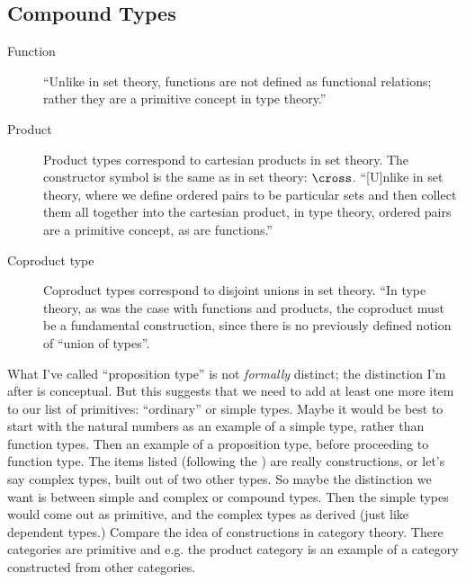 \subsection{Compound Types}
\label{subs:compountypes}

\begin{description}
\item [Function] ``Unlike in set theory, functions are not defined as
  functional relations; rather they are a primitive concept in type
  theory.'' \citep[p. 21]{hottbook}

\item [Product] Product types correspond to cartesian products in set
  theory.  The constructor symbol is the same as in set theory:
  \(\cross\).
  ``[U]nlike in set theory, where we define ordered pairs to be
  particular sets and then collect them all together into the
  cartesian product, in type theory, ordered pairs are a primitive
  concept, as are functions.''\citep[p. 26]{hottbook}

\item [Coproduct type] Coproduct types correspond to disjoint unions
  in set theory.  ``In type theory, as was the case with functions and
  products, the coproduct must be a fundamental construction, since
  there is no previously defined notion of ``union of
  types''.\citep[p. 33]{hottbook}

\end{description}

\begin{ednote}
  What I've called ``proposition type'' is not \textit{formally}
  distinct; the distinction I'm after is conceptual.  But this
  suggests that we need to add at least one more item to our list of
  primitives: ``ordinary'' or simple types.  Maybe it would be best to
  start with the natural numbers as an example of a simple type,
  rather than function types.  Then an example of a proposition type,
  before proceeding to function type.  The items listed (following the
  \HoTTB{}) are really constructions, or let's say complex types,
  built out of two other types.  So maybe the distinction we want is
  between simple and complex or compound types.  Then the simple types
  would come out as primitive, and the complex types as derived (just
  like dependent types.)  Compare the idea of constructions in
  category theory.  There categories are primitive and e.g. the
  product category is an example of a category constructed from other
  categories.
\end{ednote}

